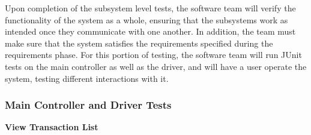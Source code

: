 \documentclass[12pt]{article}
\begin{document}
Upon completion of the subsystem level tests, the software team will verify the functionality of the system as a whole, ensuring that the subsystems work as intended once they communicate with one another. In addition, the team must make sure that the system satisfies the requirements specified during the requirements phase. For this portion of testing, the software team will run JUnit tests on the main controller as well as the driver, and will have a user operate the system, testing different interactions with it.

\subsubsection{Main Controller and Driver Tests} 
\textbf{View Transaction List}
\begin{table}[H]
\centering
\caption{Method testTransactionListClick() in MainController class}
\end{table}
\end{document}
